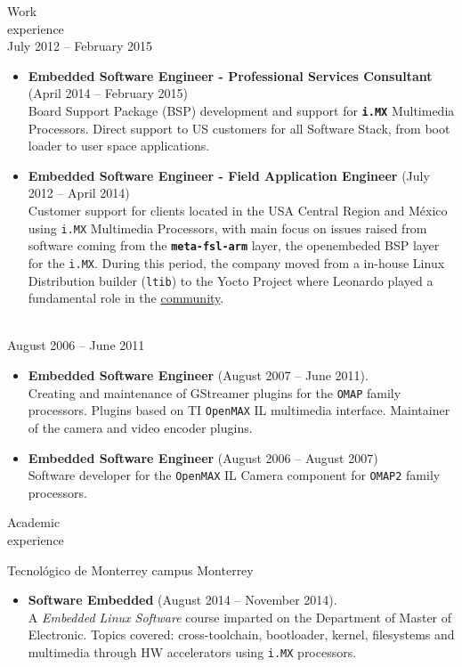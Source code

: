\documentclass{resume}
\def\itesm{Tecnol\'ogico de Monterrey campus Monterrey}
\begin{document}
\begin{category}{Work \\experience}
\\
July 2012 -- February 2015
\begin{itemize}
\item \textbf{Embedded Software Engineer - Professional Services Consultant} (April 2014 -- February 2015)\\
  Board Support Package (BSP) development and support for \textbf{\texttt{i.MX}}
  Multimedia Processors. Direct support to US customers for all Software
  Stack, from boot loader to user space applications.
\end{itemize}

\begin{itemize}
\item \textbf{Embedded Software Engineer - Field Application Engineer} (July 2012 -- April 2014)\\
  Customer support for clients located in the USA Central Region and M\'exico using
  \texttt{i.MX} Multimedia Processors, with main focus on issues raised from software
  coming from the \textbf{\texttt{meta-fsl-arm}} layer, the openembeded BSP layer for
  the \texttt{i.MX}. During this period, the company
  moved from a in-house Linux Distribution builder (\texttt{ltib}) to the Yocto Project
  where Leonardo played a fundamental role in the
  \href{https://community.nxp.com/people/LeonardoSandovalGonzalez}{community}.
\end{itemize}

\\
August 2006 -- June 2011
\begin{itemize}
\item \textbf{Embedded Software Engineer} (August 2007 -- June 2011).\\
  Creating and maintenance of GStreamer plugins for the \texttt{OMAP} family
  processors. Plugins based on TI \texttt{OpenMAX} IL multimedia interface.
  Maintainer of the camera and video encoder plugins.
\item \textbf{Embedded Software Engineer} (August 2006 -- August 2007)\\
  Software developer for the \texttt{OpenMAX} IL Camera component for
  \texttt{OMAP2} family processors.
\end{itemize}
\end{category}

\begin{category}{Academic \\experience}

\citem\itesm\\
\begin{itemize}
\item \textbf{Software Embedded} (August 2014 -- November 2014).\\
  A \textit{Embedded Linux Software} course imparted on the Department of
  Master of Electronic. Topics covered: cross-toolchain, bootloader,
  kernel, filesystems and multimedia through HW accelerators using
  \texttt{i.MX} processors.
\end{itemize}
\end{category}
\end{document}
